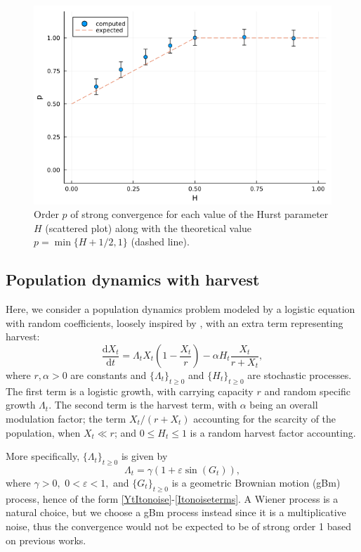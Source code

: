 \documentclass[reqno,12pt]{amsart}
\theoremstyle{plain} %
\theoremstyle{definition} %
\begin{document}
\begin{figure}[htb]
    \includegraphics[scale=0.6]{img/order_dep_on_H_fBm.png}
    \caption{Order $p$ of strong convergence for each value of the Hurst parameter $H$ (scattered plot) along with the theoretical value $p=\min\{H + 1/2, 1\}$ (dashed line).}
    \label{figorderdepHfBm}
\end{figure}

\subsection{Population dynamics with harvest}
\label{secpopdyn}

Here, we consider a population dynamics problem modeled by a logistic equation with random coefficients, loosely inspired by \cite[Section 15.2]{HanKloeden2017}, with an extra term representing harvest:
\begin{equation}
    \label{rodepopulationdynamics}
    \frac{\mathrm{d}X_t}{\mathrm{d}t} = \Lambda_t X_t (1 - \frac{X_t}{r}) - \alpha H_t \frac{X_t}{r + X_t},
\end{equation}
where $r, \alpha > 0$ are constants and $\{\Lambda_t\}_{t \geq 0}$ and $\{H_t\}_{t \geq 0}$ are stochastic processes. The first term is a logistic growth, with carrying capacity $r$ and random specific growth $\Lambda_t$. The second term is the harvest term, with $\alpha$ being an overall modulation factor; the term $X_t / (r + X_t)$ accounting for the scarcity of the population, when $X_t \ll r$; and $0 \leq H_t \leq 1$ is a random harvest factor accounting. 

More specifically, $\{\Lambda_t\}_{t \geq 0}$ is given by
\[
    \Lambda_t = \gamma (1 + \varepsilon \sin(G_t)),
\]
where $\gamma > 0,$ $0 < \varepsilon < 1,$ and $\{G_t\}_{t\geq 0}$ is a geometric Brownian motion (gBm) process, hence of the form \eqref{YtItonoise}-\eqref{Itonoiseterms}. A Wiener process is a natural choice, but we choose a gBm process instead since it is a multiplicative noise, thus the convergence would not be expected to be of strong order 1 based on previous works.
\end{document}
